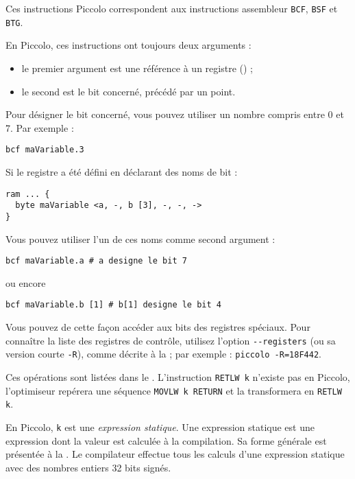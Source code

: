 
Ces instructions Piccolo correspondent aux instructions assembleur \texttt{BCF}, \texttt{BSF} et \texttt{BTG}.

En Piccolo, ces instructions ont toujours deux arguments :
\begin{itemize}
  \item le premier argument est une référence à un registre () ;
  \item le second est le bit concerné, précédé par un point.
\end{itemize}

Pour désigner le bit concerné, vous pouvez utiliser un nombre compris entre 0 et 7. Par exemple :
\begin{lstlisting}[language=piccolo]
bcf maVariable.3
\end{lstlisting}

Si le registre a été défini en déclarant des noms de bit :
\begin{lstlisting}[language=piccolo]
ram ... {
  byte maVariable <a, -, b [3], -, -, ->
}
\end{lstlisting}

Vous pouvez utiliser l’un de ces noms comme second argument :
\begin{lstlisting}[language=piccolo]
bcf maVariable.a # a designe le bit 7
\end{lstlisting}
ou encore
\begin{lstlisting}[language=piccolo]
bcf maVariable.b [1] # b[1] designe le bit 4
\end{lstlisting}

Vous pouvez de cette façon accéder aux bits des registres spéciaux. Pour connaître la liste des registres de contrôle, utilisez l’option \texttt{-{}-registers} (ou sa version courte \texttt{-R}), comme décrite à la  ; par exemple : \texttt{piccolo -R=18F442}.



Ces opérations sont listées dans le . L’instruction \texttt{RETLW k} n’existe pas en Piccolo, l’optimiseur repérera une séquence \texttt{MOVLW k RETURN} et la transformera en \texttt{RETLW k}.

En Piccolo, \texttt{k} est une \emph{expression statique}. Une expression statique est une expression dont la valeur est calculée à la compilation. Sa forme générale est présentée à la . Le compilateur effectue tous les calculs d'une expression statique avec des nombres entiers 32 bits signés.

